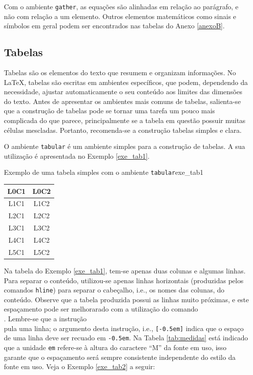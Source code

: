 Com o ambiente {\tt gather}, as equações são alinhadas em relação ao parágrafo, e não com relação a um elemento. Outros elementos matemáticos como sinais e símbolos em geral podem ser encontrados nas tabelas do Anexo \ref{anexoB}.

\subsection{Tabelas}
\label{sec:tabs}

Tabelas são os elementos do texto que resumem e organizam informações. No \LaTeX{}, tabelas são escritas em ambientes específicos, que podem, dependendo da necessidade, ajustar automaticamente o seu conteúdo aos limites das dimensões do texto. Antes de apresentar os ambientes mais comuns de tabelas, salienta-se que a construção de tabelas pode se tornar uma tarefa um pouco mais complicada do que parece, principalmente se a tabela em questão possuir muitas células mescladas. Portanto, recomenda-se a construção tabelas simples e clara.

O ambiente {\tt tabular} é um ambiente simples para a construção de tabelas. A sua utilização é apresentada no Exemplo \ref{exe_tab1}.

\begin{texexptitled}[breakable,center lower,enhanced,middle=2mm]{Exemplo de uma tabela simples com o ambiente {\tt tabular}}{exe_tab1}
\begin{tabular}{c c}
\hline 
\textbf{L0C1} & \textbf{L0C2} \\
\hline
L1C1 & L1C2 \\
L2C1 & L2C2 \\
L3C1 & L3C2 \\
L4C1 & L4C2 \\
L5C1 & L5C2 \\
\hline
\end{tabular}
\end{texexptitled}

Na tabela do Exemplo \ref{exe_tab1}, tem-se apenas duas colunas e algumas linhas. Para separar o conteúdo, utilizou-se apenas linhas horizontais (produzidas pelos comandos {\tt hline}) para separar o cabeçalho, i.e., os nomes das colunas, do conteúdo. Observe que a tabela produzida possui as linhas muito próximas, e este espaçamento pode ser melhorarado com a utilização do comando \texttt{\\[-0.5em]}. Lembre-se que a instrução \texttt{\\} pula uma linha; o argumento desta instrução, i.e., \texttt{[-0.5em]} indica que o espaço de uma linha deve ser recuado em {\tt -0.5em}. Na Tabela \ref{tab:medidas} está indicado que a unidade {\tt em} refere-se à altura do caractere ``M'' da fonte em uso, isso garante que o espaçamento será sempre consistente independente do estilo da fonte em uso. Veja o Exemplo \ref{exe_tab2} a seguir:

